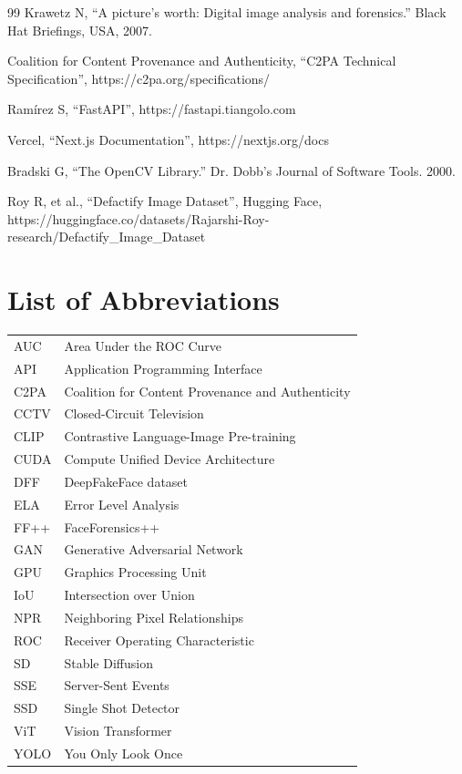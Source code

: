 \documentclass[12pt,a4paper,oneside]{report}
\begin{document}
\begin{thebibliography}{99}
 Krawetz N, ``A picture's worth: Digital image analysis and forensics.'' Black Hat Briefings, USA, 2007.

 Coalition for Content Provenance and Authenticity, ``C2PA Technical Specification'', https://c2pa.org/specifications/

 Ram\'irez S, ``FastAPI'', https://fastapi.tiangolo.com

 Vercel, ``Next.js Documentation'', https://nextjs.org/docs

 Bradski G, ``The OpenCV Library.'' Dr. Dobb's Journal of Software Tools. 2000.

 Roy R, et al., ``Defactify Image Dataset'', Hugging Face, https://huggingface.co/datasets/Rajarshi-Roy-research/Defactify\_Image\_Dataset

\end{thebibliography}

\appendix
\chapter{List of Abbreviations}
\begin{tabular}{@{}ll@{}}
AUC & Area Under the ROC Curve \\
API & Application Programming Interface \\
C2PA & Coalition for Content Provenance and Authenticity \\
CCTV & Closed-Circuit Television \\
CLIP & Contrastive Language-Image Pre-training \\
CUDA & Compute Unified Device Architecture \\
DFF & DeepFakeFace dataset \\
ELA & Error Level Analysis \\
FF++ & FaceForensics++ \\
GAN & Generative Adversarial Network \\
GPU & Graphics Processing Unit \\
IoU & Intersection over Union \\
NPR & Neighboring Pixel Relationships \\
ROC & Receiver Operating Characteristic \\
SD & Stable Diffusion \\
SSE & Server-Sent Events \\
SSD & Single Shot Detector \\
ViT & Vision Transformer \\
YOLO & You Only Look Once \\
\end{tabular}
\end{document}

